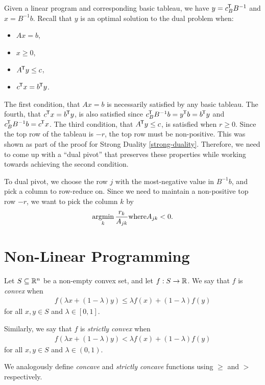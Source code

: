 Given a linear program and corresponding basic tableau, we have $y = c_B^{\mkern-1.5mu\mathsf{T}}B^{-1}$ and $x = B^{-1}b$. Recall that $y$ is an optimal solution to the dual problem when:
\begin{itemize}
    \item $Ax = b$,
    \item $x \geq 0$,
    \item $A^{\mkern-1.5mu\mathsf{T}}y \leq c$,
    \item $c^{\mkern-1.5mu\mathsf{T}}x = b^{\mkern-1.5mu\mathsf{T}}y$.
\end{itemize}

The first condition, that $Ax = b$ is necessarily satisfied by any basic tableau. The fourth, that $c^{\mkern-1.5mu\mathsf{T}}x = b^{\mkern-1.5mu\mathsf{T}}y$, is also satisfied since $c_B^{\mkern-1.5mu\mathsf{T}}B^{-1}b = y^{\mkern-1.5mu\mathsf{T}}b = b^{\mkern-1.5mu\mathsf{T}}y$ and $c_B^{\mkern-1.5mu\mathsf{T}}B^{-1}b = c^{\mkern-1.5mu\mathsf{T}}x$. The third condition, that $A^{\mkern-1.5mu\mathsf{T}}y \leq c$, is satisfied when $r \geq 0$. Since the top row of the tableau is $-r$, the top row must be non-positive. This was shown as part of the proof for Strong Duality \ref{strong-duality}. Therefore, we need to come up with a ``dual pivot'' that preserves these properties while working towards achieving the second condition.

To dual pivot, we choose the row $j$ with the most-negative value in $B^{-1}b$, and pick a column to row-reduce on. Since we need to maintain a non-positive top row $-r$, we want to pick the column $k$ by \[\operatorname*{argmin}_{k}\frac{r_k}{A_{jk}} \mathrm{ where } A_{jk} < 0.\]

\section{Non-Linear Programming}

\begin{defn}
    Let $S \subseteq \mathbb{R}^n$ be a non-empty convex set, and let $f: S \to \mathbb{R}$. We say that $f$ is \emph{convex} when
    \begin{align*}
        f\left(\lambda x + (1 - \lambda)y\right) \leq \lambda f(x) + (1 - \lambda)f(y)
    \end{align*}
    for all $x, y \in S$ and $\lambda \in [0, 1]$.

    Similarly, we say that $f$ is \emph{strictly convex} when
    \begin{align*}
        f\left(\lambda x + (1 - \lambda)y\right) < \lambda f(x) + (1 - \lambda)f(y)
    \end{align*}
    for all $x, y \in S$ and $\lambda \in (0, 1)$.

    We analogously define \emph{concave} and \emph{strictly concave} functions using $\geq$ and $>$ respectively.
\end{defn}

